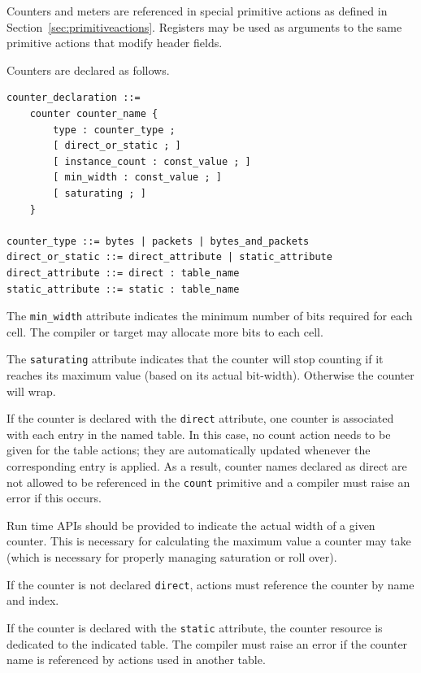 \documentclass[12pt]{article}
\begin{document}
Counters and meters are referenced in special primitive actions as defined 
in Section~\ref{sec:primitiveactions}. Registers may be used as arguments to 
the same primitive actions that modify header fields.


Counters are declared as follows.

\begin{lstlisting}[style=BNFstyle]
counter_declaration ::=
    counter counter_name { 
        type : counter_type ;
        [ direct_or_static ; ]
        [ instance_count : const_value ; ]
        [ min_width : const_value ; ]
        [ saturating ; ]
    }

counter_type ::= bytes | packets | bytes_and_packets
direct_or_static ::= direct_attribute | static_attribute
direct_attribute ::= direct : table_name
static_attribute ::= static : table_name
\end{lstlisting}


The \texttt{min_width} attribute indicates the minimum number of bits
required for each cell.  The compiler or target may allocate more bits
to each cell.

The \texttt{saturating} attribute indicates that the counter will stop
counting if it reaches its maximum value (based on its actual
bit-width). Otherwise the counter will wrap.

If the counter is declared with the \texttt{direct} attribute, one
counter is associated with each entry in the named table. In this
case, no count action needs to be given for the table actions; they
are automatically updated whenever the corresponding entry is
applied. As a result, counter names declared as direct are not allowed
to be referenced in the \texttt{count} primitive and a compiler must
raise an error if this occurs.

Run time APIs should be provided to indicate the actual width of a
given counter.  This is necessary for calculating the maximum value a
counter may take (which is necessary for properly managing saturation
or roll over).

If the counter is not declared \texttt{direct}, actions must reference
the counter by name and index.

If the counter is declared with the \texttt{static} attribute, the
counter resource is dedicated to the indicated table. The compiler
must raise an error if the counter name is referenced by actions used
in another table.
\end{document}

